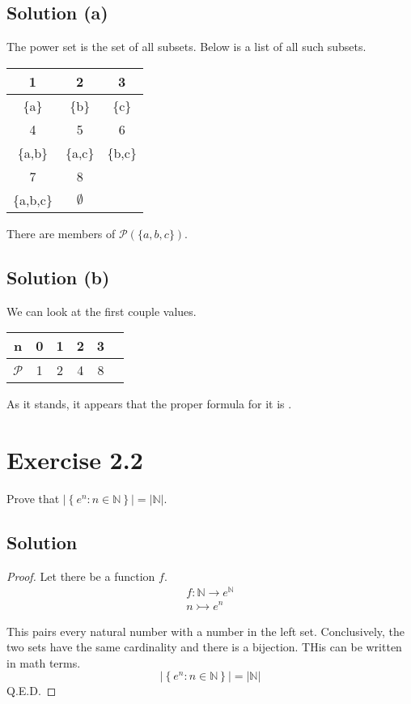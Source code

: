 \documentclass[12pt]{report}
\begin{document}
\subsection{Solution (a)}
The power set is the set of all subsets.
Below is a list of all such subsets.
\begin{center}
    \begin{tabular}{|c|c|c|}
        \hline
        1 & 2 & 3 \\
        \hline
        \{a\} & \{b\} & \{c\} \\
        \hline \hline
        4 & 5 & 6 \\
        \hline
        \{a,b\} & \{a,c\} & \{b,c\} \\
        \hline \hline
        7 & 8 & \\
        \hline
        \{a,b,c\} & $\emptyset$ & \\
        \hline
    \end{tabular}
\end{center}

There are  members of $\mathcal{P}(\{a,b,c\})$. 

\subsection{Solution (b)}
We can look at the first couple values.
\begin{center}
    \begin{tabular}{|c|c|c|c|c|c}
        \hline
        n & 0 & 1 & 2 & 3 \\
        \hline
        $\mathcal{P}$ & 1 & 2 & 4 & 8 \\
        \hline
    \end{tabular}
\end{center}

As it stands, it appears that the proper formula for it is . 

\pagebreak
\section{Exercise 2.2}
Prove that $\left|\left\{ e^n : n \in \mathbb{N} \right\}\right| = \left| \mathbb{N} \right|$.

\subsection*{Solution}
\begin{proof}
    Let there be a function $f$.
    \begin{gather}
        f: \mathbb{N} \rightarrow e^\mathbb{N}\\
        n \rightarrowtail e^n
    \end{gather}
    
    This pairs every natural number with a number in the left set.
    Conclusively, the two sets have the same cardinality and there is a bijection.
    THis can be written in math terms.
    \begin{equation}
        \left|\left\{ e^n : n \in \mathbb{N} \right\}\right| = \left| \mathbb{N} \right|
    \end{equation}
    Q.E.D.
\end{proof}
\end{document}
